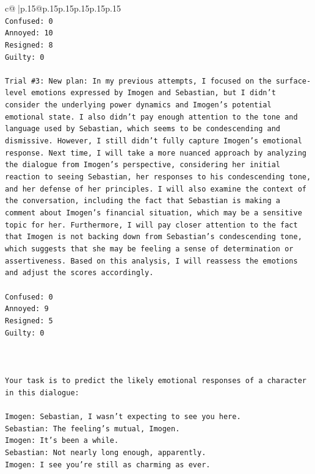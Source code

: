\documentclass{article}
\begin{document}
{\begin{supertabular}{c@{$\;$}|p{.15\linewidth}@{}p{.15\linewidth}p{.15\linewidth}p{.15\linewidth}p{.15\linewidth}p{.15\linewidth}}
{{{\\ 
\texttt{Confused: 0} \\
\texttt{Annoyed: 10} \\
\texttt{Resigned: 8} \\
\texttt{Guilty: 0} \\
\\ 
\texttt{Trial \#3: New plan: In my previous attempts, I focused on the surface{-}level emotions expressed by Imogen and Sebastian, but I didn't consider the underlying power dynamics and Imogen's potential emotional state. I also didn't pay enough attention to the tone and language used by Sebastian, which seems to be condescending and dismissive. However, I still didn't fully capture Imogen's emotional response. Next time, I will take a more nuanced approach by analyzing the dialogue from Imogen's perspective, considering her initial reaction to seeing Sebastian, her responses to his condescending tone, and her defense of her principles. I will also examine the context of the conversation, including the fact that Sebastian is making a comment about Imogen's financial situation, which may be a sensitive topic for her. Furthermore, I will pay closer attention to the fact that Imogen is not backing down from Sebastian's condescending tone, which suggests that she may be feeling a sense of determination or assertiveness. Based on this analysis, I will reassess the emotions and adjust the scores accordingly. } \\
\\ 
\texttt{Confused: 0} \\
\texttt{Annoyed: 9} \\
\texttt{Resigned: 5} \\
\texttt{Guilty: 0} \\
\\ 
\\ 
\\ 
\texttt{Your task is to predict the likely emotional responses of a character in this dialogue:} \\
\\ 
\texttt{Imogen: Sebastian, I wasn't expecting to see you here.} \\
\texttt{Sebastian: The feeling's mutual, Imogen.} \\
\texttt{Imogen: It's been a while.} \\
\texttt{Sebastian: Not nearly long enough, apparently.} \\
\texttt{Imogen: I see you're still as charming as ever.} \\
}}}
\end{supertabular}}
\end{document}
